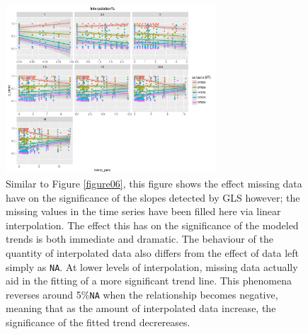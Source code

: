 \documentclass[]{ametsoc}
\begin{document}

\begin{figure}
\centering \includegraphics[width=0.7\textwidth]{figureA}
\caption[\small Similar to Figure \ref{figure06}, this figure shows the effect missing data have on]{Similar to Figure \ref{figure06}, this figure shows the effect missing data have on the significance of the slopes detected by GLS however; the missing values in the time series have been filled here via linear interpolation. The effect this has on the significance of the modeled trends is both immediate and dramatic. The behaviour of the quantity of interpolated data also differs from the effect of data left simply as \texttt{NA}. At lower levels of interpolation, missing data actually aid in the fitting of a more significant trend line. This phenomena reverses around 5\%\texttt{NA} when the relationship becomes negative, meaning that as the amount of interpolated data increase, the significance of the fitted trend decrereases.}
\label{figureA}
\end{figure}
\end{document}
